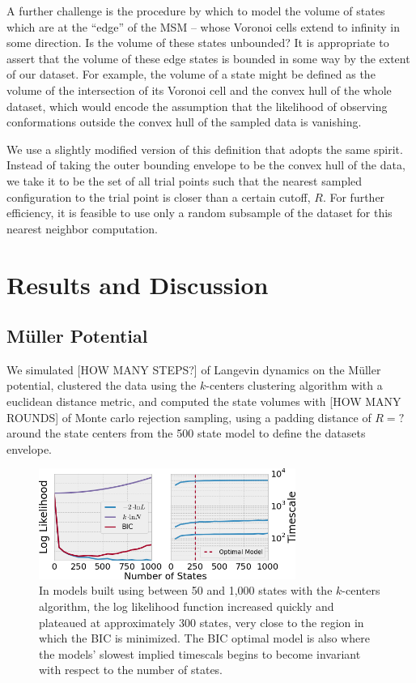 \documentclass[twocolumn,floatfix,nofootinbib,aps]{revtex4-1}
\begin{document}
A further challenge is the procedure by which to model the volume of states which are at the ``edge'' of the MSM -- whose Voronoi cells extend to infinity in some direction. Is the volume of these states unbounded? It is appropriate to assert that the volume of these edge states is bounded in some way by the extent of our dataset. For example, the volume of a state might be defined as the volume of the intersection of its Voronoi cell and the convex hull of the whole dataset, which would encode the assumption that the likelihood of observing conformations outside the convex hull of the sampled data is vanishing.

We use a slightly modified version of this definition that adopts the same spirit. Instead of taking the outer bounding envelope to be the convex hull of the data, we take it to be the set of all trial points such that the nearest sampled configuration to the trial point is closer than a certain cutoff, $R$. For further efficiency, it is feasible to use only a random subsample of the dataset for this nearest neighbor computation.

\section{Results and Discussion}
\subsection{M\"{u}ller Potential}
We simulated [HOW MANY STEPS?] of Langevin dynamics on the M\"{u}ller potential, clustered the data using the $k$-centers clustering algorithm with a euclidean distance metric, and computed the state volumes with [HOW MANY ROUNDS] of Monte carlo rejection sampling, using a padding distance of $R=?$ around the state centers from the 500 state model to define the datasets envelope.


\begin{figure}[h]
\centering
\includegraphics[width=3.3in]{figs/muller_bic_timescales.png}
\caption{In models built using between 50 and 1,000 states with the $k$-centers algorithm, the log likelihood function increased quickly and plateaued at approximately 300 states, very close to the region in which the BIC is minimized. The BIC optimal model is also where the models' slowest implied timescals begins to become invariant with respect to the number of states.}
\label{fig:mullerlike}
\end{figure}
\end{document}
